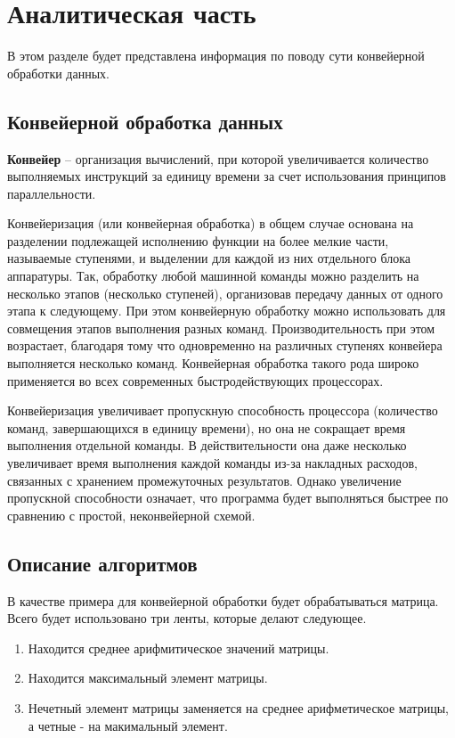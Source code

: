 \chapter{Аналитическая часть}
В этом разделе будет представлена информация по поводу сути конвейерной обработки данных.


\section{Конвейерной обработка данных}

\textbf{Конвейер} \cite{conveyer} -- организация вычислений, при которой увеличивается количество выполняемых инструкций за единицу времени за счет использования принципов параллельности.

Конвейеризация (или конвейерная обработка) в общем случае основана на разделении подлежащей исполнению функции на более мелкие части, называемые ступенями, и выделении для каждой из них отдельного блока аппаратуры. Так, обработку любой машинной команды можно разделить на несколько этапов (несколько ступеней), организовав передачу данных от одного этапа к следующему. При этом конвейерную обработку можно использовать для совмещения этапов выполнения разных команд. Производительность при этом возрастает, благодаря тому что одновременно на различных ступенях конвейера выполняется несколько команд. Конвейерная обработка такого рода широко применяется во всех современных быстродействующих процессорах.

Конвейеризация увеличивает пропускную способность процессора (количество команд, завершающихся в единицу времени), но она не сокращает время выполнения отдельной команды. В действительности она даже несколько увеличивает время выполнения каждой команды из-за накладных расходов, связанных с хранением промежуточных результатов. Однако увеличение пропускной способности означает, что программа будет выполняться быстрее по сравнению с простой, неконвейерной схемой.


\section{Описание алгоритмов}

В качестве примера для конвейерной обработки будет обрабатываться матрица. Всего будет использовано три ленты, которые делают следующее.

\begin{enumerate}
	\item Находится среднее арифмитическое значений матрицы.
	\item Находится максимальный элемент матрицы.
	\item Нечетный элемент матрицы заменяется на среднее арифметическое матрицы, а четные - на макимальный элемент.
\end{enumerate}


